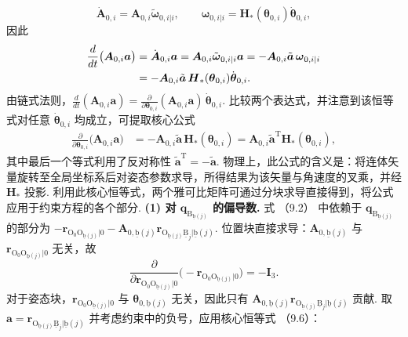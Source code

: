 \[
\dot{\boldsymbol{A}}_{0,i} = \boldsymbol{A}_{0,i}\tilde{\boldsymbol{\omega}}_{0,i|i}, \qquad \boldsymbol{\omega}_{0,i|i} = \boldsymbol{H}_*(\boldsymbol{\theta}_{0,i})\dot{\boldsymbol{\theta}}_{0,i},
\]
因此
\begin{align*}\frac{d}{dt}\big(\boldsymbol{A}_{0,i}\boldsymbol{a}\big) &= \dot{\boldsymbol{A}}_{0,i}\boldsymbol{a} = \boldsymbol{A}_{0,i}\tilde{\boldsymbol{\omega}}_{0,i|i}\boldsymbol{a} = -\boldsymbol{A}_{0,i}\tilde{\boldsymbol{a}}\,\boldsymbol{\omega}_{0,i|i} \notag \\
    &= -\boldsymbol{A}_{0,i}\tilde{\boldsymbol{a}}\,\boldsymbol{H}_*(\boldsymbol{\theta}_{0,i})\dot{\boldsymbol{\theta}}_{0,i}.\end{align*}
由链式法则，$\frac{d}{dt}(\boldsymbol{A}_{0,i}\boldsymbol{a}) = \frac{\partial}{\partial \boldsymbol{\theta}_{0,i}}(\boldsymbol{A}_{0,i}\boldsymbol{a})\,\dot{\boldsymbol{\theta}}_{0,i}$. 比较两个表达式，并注意到该恒等式对任意 $\dot{\boldsymbol{\theta}}_{0,i}$ 均成立，可提取核心公式
\begin{align*}\frac{\partial}{\partial \boldsymbol{\theta}_{0,i}}\big(\boldsymbol{A}_{0,i}\boldsymbol{a}\big)
    &= -\boldsymbol{A}_{0,i}\tilde{\boldsymbol{a}}\,\boldsymbol{H}_*(\boldsymbol{\theta}_{0,i}) = \boldsymbol{A}_{0,i}\tilde{\boldsymbol{a}}^\text{T}\boldsymbol{H}_*(\boldsymbol{\theta}_{0,i}),\end{align*}
其中最后一个等式利用了反对称性 $\tilde{\boldsymbol{a}}^\text{T} = -\tilde{\boldsymbol{a}}$. 物理上，此公式的含义是：将连体矢量旋转至全局坐标系后对姿态参数求导，所得结果为该矢量与角速度的叉乘，并经 $\boldsymbol{H}_*$ 投影.
利用此核心恒等式，两个雅可比矩阵可通过分块求导直接得到，将公式应用于约束方程的各个部分.
\textbf{(1) 对 $\boldsymbol{q}_{\text{B}_{\underline{\text{b}}(j)}}$ 的偏导数.}
式 （9.2） 中依赖于 $\boldsymbol{q}_{\text{B}_{\underline{\text{b}}(j)}}$ 的部分为 $-\boldsymbol{r}_{\text{O}_0\text{O}_{\underline{\text{b}}(j)}|0} - \boldsymbol{A}_{0,\underline{\text{b}}(j)}\boldsymbol{r}_{\text{O}_{\underline{\text{b}}(j)}\underline{\text{B}}_j|\underline{\text{b}}(j)}$.
位置块直接求导：$\boldsymbol{A}_{0,\underline{\text{b}}(j)}$ 与 $\boldsymbol{r}_{\text{O}_0\text{O}_{\underline{\text{b}}(j)}|0}$ 无关，故
\[
\frac{\partial}{\partial \boldsymbol{r}_{\text{O}_0\text{O}_{\underline{\text{b}}(j)}|0}}\big(-\boldsymbol{r}_{\text{O}_0\text{O}_{\underline{\text{b}}(j)}|0}\big) = -\boldsymbol{I}_3.
\]
对于姿态块，$\boldsymbol{r}_{\text{O}_0\text{O}_{\underline{\text{b}}(j)}|0}$ 与 $\boldsymbol{\theta}_{0,\underline{\text{b}}(j)}$ 无关，因此只有 $\boldsymbol{A}_{0,\underline{\text{b}}(j)}\boldsymbol{r}_{\text{O}_{\underline{\text{b}}(j)}\underline{\text{B}}_j|\underline{\text{b}}(j)}$ 贡献. 取 $\boldsymbol{a} = \boldsymbol{r}_{\text{O}_{\underline{\text{b}}(j)}\underline{\text{B}}_j|\underline{\text{b}}(j)}$ 并考虑约束中的负号，应用核心恒等式 （9.6）：
